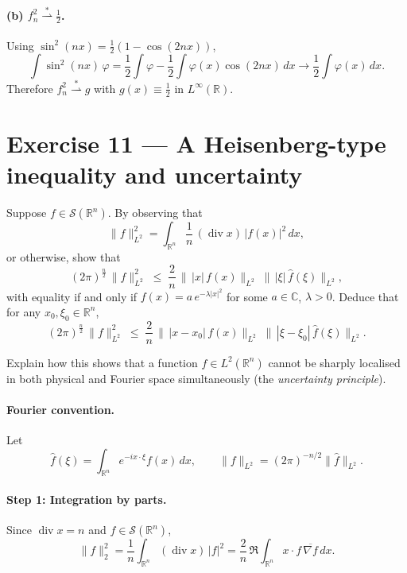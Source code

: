 \documentclass[12pt,a4paper]{article}
\theoremstyle{plain}
\theoremstyle{definition}
\theoremstyle{remark}
\theoremstyle{remark}
\begin{document}
\paragraph{(b) $f_n^2 \overset{*}\rightharpoonup \tfrac12$.}
Using $\sin^2(nx)=\frac12(1-\cos(2nx))$,
\[
\int \sin^2(nx)\,\varphi
= \frac12\int \varphi - \frac12\int \varphi(x)\cos(2nx)\,dx
\longrightarrow \frac12\int \varphi(x)\,dx.
\]
Therefore $f_n^2 \overset{*}\rightharpoonup g$ with $g(x)\equiv \frac12$ in $L^\infty(\mathbb R)$.

\bigskip
\bigskip

\section*{Exercise 11 — A Heisenberg-type inequality and uncertainty}

Suppose $f\in \mathcal S(\mathbb R^n)$. By observing that
\[
\|f\|_{L^2}^2
=\int_{\mathbb R^n}\frac{1}{n}\,(\operatorname{div}x)\,|f(x)|^2\,dx,
\]
or otherwise, show that
\[
(2\pi)^{\frac n2}\,\|f\|_{L^2}^2
\;\le\; \frac{2}{n}\,\big\|\,|x|\,f(x)\big\|_{L^2}\;\big\|\,|\xi|\,\widehat f(\xi)\big\|_{L^2},
\]
with equality if and only if $f(x)=a\,e^{-\lambda|x|^2}$ for some $a\in\mathbb C$, $\lambda>0$.
Deduce that for any $x_0,\xi_0\in\mathbb R^n$,
\[
(2\pi)^{\frac n2}\,\|f\|_{L^2}^2
\;\le\; \frac{2}{n}\,\big\|\,|x-x_0|\,f(x)\big\|_{L^2}\;\big\|\,|\xi-\xi_0|\,\widehat f(\xi)\big\|_{L^2}.
\]

\medskip

\noindent Explain how this shows that a function $f\in L^2(\mathbb R^n)$ cannot be sharply localised in both physical and Fourier space simultaneously (the \emph{uncertainty principle}).


\paragraph{Fourier convention.}
Let
\[
\widehat f(\xi)=\int_{\mathbb R^n} e^{-i x\cdot \xi} f(x)\,dx,
\qquad \|f\|_{L^2}=(2\pi)^{-n/2}\|\widehat f\|_{L^2}.
\]

\smallskip

\paragraph{Step 1: Integration by parts.}
Since $\operatorname{div}x=n$ and $f\in\mathcal S(\mathbb R^n)$,
\[
\|f\|_2^2
=\frac1n\int_{\mathbb R^n}(\operatorname{div}x)\,|f|^2
=\frac2n\,\Re\int_{\mathbb R^n} x\cdot f\,\overline{\nabla f}\,dx.
\]
\end{document}
